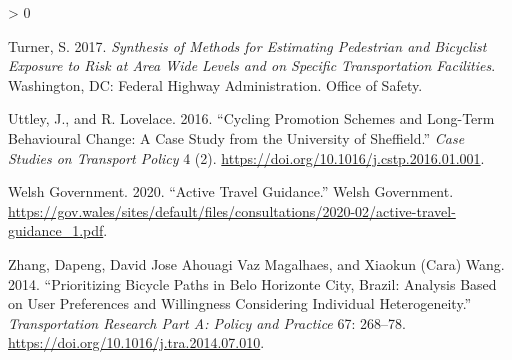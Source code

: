 \documentclass[galley]{jtlu-article-2col}
\newlength{\cslhangindent}
\newenvironment{CSLReferences}[2] %
 {%
  \setlength{\parindent}{0pt}
  \ifodd #1 \everypar{\setlength{\hangindent}{\cslhangindent}}\ignorespaces\fi
  \ifnum #2 > 0
  \setlength{\parskip}{#2\baselineskip}
  \fi
 }%
 {}
\begin{document}
\begin{CSLReferences}{1}{0}
\leavevmode\hypertarget{ref-turner_synthesis_2017}{}%
Turner, S. 2017. \emph{Synthesis of Methods for Estimating Pedestrian and Bicyclist Exposure to Risk at Area Wide Levels and on Specific Transportation Facilities}. {Washington, DC}: {Federal Highway Administration. Office of Safety}.

\leavevmode\hypertarget{ref-uttley_cycling_2016}{}%
Uttley, J., and R. Lovelace. 2016. {``Cycling Promotion Schemes and Long-Term Behavioural Change: {A} Case Study from the {University} of {Sheffield}.''} \emph{Case Studies on Transport Policy} 4 (2). \url{https://doi.org/10.1016/j.cstp.2016.01.001}.

\leavevmode\hypertarget{ref-welshgovernment_active_2020}{}%
Welsh Government. 2020. {``Active {Travel Guidance}.''} {Welsh Government}. \url{https://gov.wales/sites/default/files/consultations/2020-02/active-travel-guidance_1.pdf}.

\leavevmode\hypertarget{ref-zhang_prioritizing_2014}{}%
Zhang, Dapeng, David Jose Ahouagi Vaz Magalhaes, and Xiaokun (Cara) Wang. 2014. {``Prioritizing Bicycle Paths in {Belo Horizonte City}, {Brazil}: {Analysis} Based on User Preferences and Willingness Considering Individual Heterogeneity.''} \emph{Transportation Research Part A: Policy and Practice} 67: 268--78. \url{https://doi.org/10.1016/j.tra.2014.07.010}.

\end{CSLReferences}

%
%
%
%
%
%
%
%







\end{document}
